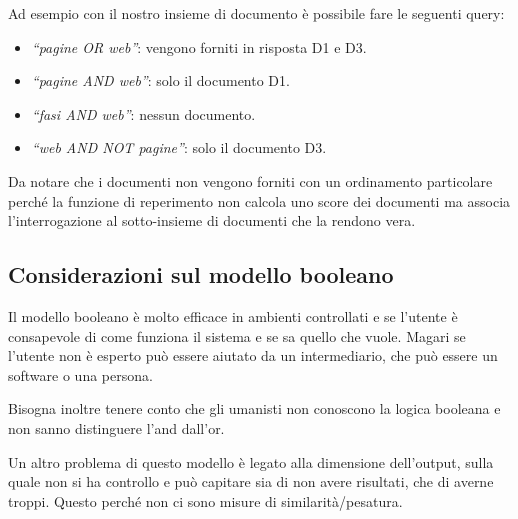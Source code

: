 


\noindent Ad esempio con il nostro insieme di documento è possibile fare le seguenti query:

\begin{itemize}
	\item \textit{``pagine OR web''}: vengono forniti in risposta D1 e D3.
	\item \textit{``pagine AND web''}: solo il documento D1.
	\item \textit{``fasi AND web''}: nessun documento.
	\item \textit{``web AND NOT pagine''}: solo il documento D3. 	
\end{itemize}

\noindent Da notare che i documenti non vengono forniti con un ordinamento particolare perché la funzione di reperimento non calcola uno score dei documenti ma associa l'interrogazione al sotto-insieme di documenti che la rendono vera.

\subsection{Considerazioni sul modello booleano}

Il modello booleano è molto efficace in ambienti controllati e se l'utente è consapevole di come funziona il sistema e se sa quello che vuole. Magari se l'utente non è esperto può essere aiutato da un intermediario, che può essere un software o una persona.

Bisogna inoltre tenere conto che gli umanisti non conoscono la logica booleana e non sanno distinguere l'and dall'or.

Un altro problema di questo modello è legato alla dimensione dell'output, sulla quale non si ha controllo e può capitare sia di non avere risultati, che di averne troppi. Questo perché non ci sono misure di similarità/pesatura.

